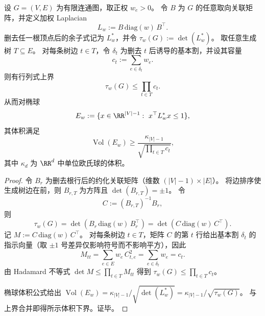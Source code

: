 \begin{proposition}\label{prop:spg-kirchhoff-fundamental-cut-capacity-hadamard}
设 \(G=(V,E)\) 为有限连通图，取正权 \(w_e>0\)。
令 \(B\) 为 \(G\) 的任意取向关联矩阵，并定义加权 Laplacian
\[
L_w:=B\,\mathrm{diag}(w)\,B^\top .
\]
删去任一根顶点后的余子式记为 \(L_w^\ast\)，并令
\(
\tau_w(G):=\det(L_w^\ast)
\)。
取任意生成树 \(T\subseteq E\)。
对每条树边 \(t\in T\)，令 \(\delta_t\) 为删去 \(t\) 后诱导的基本割，并设其容量
\[
c_t:=\sum_{e\in\delta_t} w_e.
\]
则有行列式上界
\[
\tau_w(G)\le \prod_{t\in T} c_t.
\]
从而对椭球
\[
E_w:=\{x\in\RR^{|V|-1}:\ x^\top L_w^\ast x\le 1\},
\]
其体积满足
\[
\operatorname{Vol}(E_w)\ge \frac{\kappa_{|V|-1}}{\sqrt{\prod_{t\in T} c_t}},
\]
其中 \(\kappa_d\) 为 \(\RR^d\) 中单位欧氏球的体积。
\end{proposition}
\begin{proof}
令 \(B_r\) 为删去根行后的约化关联矩阵（维数 \((|V|-1)\times |E|\)）。
将边排序使生成树边在前，则 \(B_{r,T}\) 为方阵且 \(\det(B_{r,T})=\pm1\)。
令
\[
C:=(B_{r,T})^{-1}B_r,
\]
则
\[
\tau_w(G)=\det(B_r\,\mathrm{diag}(w)\,B_r^\top)=\det(C\,\mathrm{diag}(w)\,C^\top).
\]
记 \(M:=C\,\mathrm{diag}(w)\,C^\top\)。
对每条树边 \(t\in T\)，矩阵 \(C\) 的第 \(t\) 行给出基本割 \(\delta_t\) 的指示向量（取 \(\pm1\) 号差异仅影响符号而不影响平方），因此
\[
M_{tt}=\sum_{e\in E} w_e\,C_{t,e}^2=\sum_{e\in\delta_t} w_e=c_t.
\]
由 Hadamard 不等式 \(\det M\le \prod_{t\in T} M_{tt}\) 得到 \(\tau_w(G)\le \prod_{t\in T} c_t\)。
\par
椭球体积公式给出
\(
\operatorname{Vol}(E_w)=\kappa_{|V|-1}/\sqrt{\det(L_w^\ast)}=\kappa_{|V|-1}/\sqrt{\tau_w(G)}
\)。
与上界合并即得所示体积下界。证毕。
\end{proof}

\endinput
